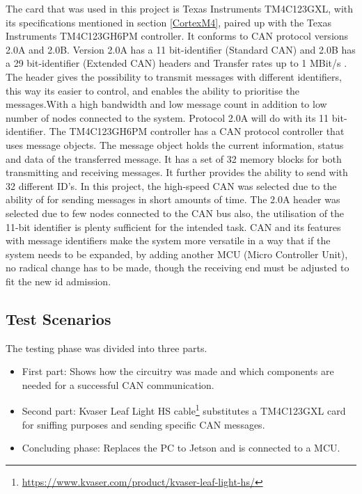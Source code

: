 The card that was used in this project is Texas Instruments TM4C123GXL, with its specifications mentioned in section  \ref{CortexM4}, paired up with the Texas Instruments TM4C123GH6PM \cite{TexasInstruments} controller. It conforms to CAN protocol versions 2.0A and 2.0B. Version 2.0A has a 11 bit-identifier (Standard CAN) and 2.0B has a 29 bit-identifier (Extended CAN) headers and Transfer rates up to 1 MBit/s \cite{TexasInstruments}. The header gives the possibility to transmit messages with different identifiers, this way its easier to control, and enables the ability to prioritise the messages.\newline  With a high bandwidth and low message count in addition to low number of nodes connected to the system. Protocol 2.0A will do with its 11 bit-identifier. The TM4C123GH6PM controller has a CAN protocol controller that uses message objects. The message object holds the current information, status and data of the transferred message. It has a set of 32 memory blocks for both transmitting and receiving messages. It further provides the ability to send with 32 different ID's.\newline
\indent In this project, the high-speed CAN was selected due to the ability of for sending messages in short amounts of time. The 2.0A header was selected due to few nodes connected to the CAN bus also, the utilisation of the 11-bit identifier is plenty sufficient for the intended task. CAN and its features with message identifiers make the system more versatile in a way that if the system needs to be expanded, by adding another MCU (Micro Controller Unit), no radical change has to be made, though the receiving end must be adjusted to fit the new id admission.

\subsection{Test Scenarios} 
The testing phase was divided into three parts. \newline
\begin{itemize}
    \item First part: Shows how the circuitry was made and which components are needed for a successful CAN communication.
    \item Second part: Kvaser Leaf Light HS cable\footnote{\url{https://www.kvaser.com/product/kvaser-leaf-light-hs/}} substitutes a TM4C123GXL card for sniffing purposes and sending specific CAN messages.
    \item Concluding phase: Replaces the PC to Jetson and is connected to a MCU.
\end{itemize}
